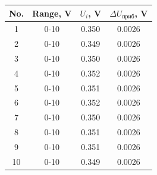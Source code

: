 \begin{tabular}{|c|c|c|c|}
\hline
No. & Range, V & $U_i$, V & $\Delta U_{\text{приб}}$, V \\
\hline
1 & 0-10 & 0.350 & 0.0026 \\
2 & 0-10 & 0.349 & 0.0026 \\
3 & 0-10 & 0.350 & 0.0026 \\
4 & 0-10 & 0.352 & 0.0026 \\
5 & 0-10 & 0.351 & 0.0026 \\
6 & 0-10 & 0.352 & 0.0026 \\
7 & 0-10 & 0.350 & 0.0026 \\
8 & 0-10 & 0.351 & 0.0026 \\
9 & 0-10 & 0.351 & 0.0026 \\
10 & 0-10 & 0.349 & 0.0026 \\
\hline
\end{tabular}
